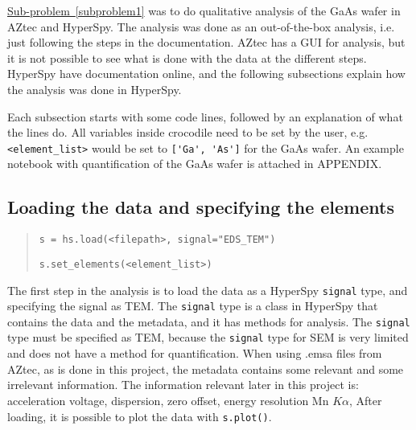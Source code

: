 \hyperref[subproblem1]{Sub-problem~\ref*{subproblem1}} was to do qualitative analysis of the GaAs wafer in AZtec and HyperSpy.
The analysis was done as an out-of-the-box analysis, i.e. just following the steps in the documentation.
AZtec has a GUI for analysis, but it is not possible to see what is done with the data at the different steps.
HyperSpy have documentation online, and the following subsections explain how the analysis was done in HyperSpy.

Each subsection starts with some code lines, followed by an explanation of what the lines do.
All variables inside crocodile need to be set by the user, e.g. \verb|<element_list>| would be set to \verb|['Ga', 'As']| for the GaAs wafer.
An example notebook with quantification of the GaAs wafer is attached in APPENDIX.

\subsection{Loading the data and specifying the elements}
\label{sec:discussion:steps:load}
\begin{quote}
    \verb|s = hs.load(<filepath>, signal="EDS_TEM")|

    \verb|s.set_elements(<element_list>)|
\end{quote}

The first step in the analysis is to load the data as a HyperSpy \verb|signal| type, and specifying the signal as TEM.
The \verb|signal| type is a class in HyperSpy that contains the data and the metadata, and it has methods for analysis.
The \verb|signal| type must be specified as TEM, because the \verb|signal| type for SEM is very limited and does not have a method for quantification.
When using .emsa files from AZtec, as is done in this project, the metadata contains some relevant and some irrelevant information.
The information relevant later in this project is:
acceleration voltage, dispersion, zero offset, energy resolution Mn $K\alpha$,
After loading, it is possible to plot the data with \verb|s.plot()|.

